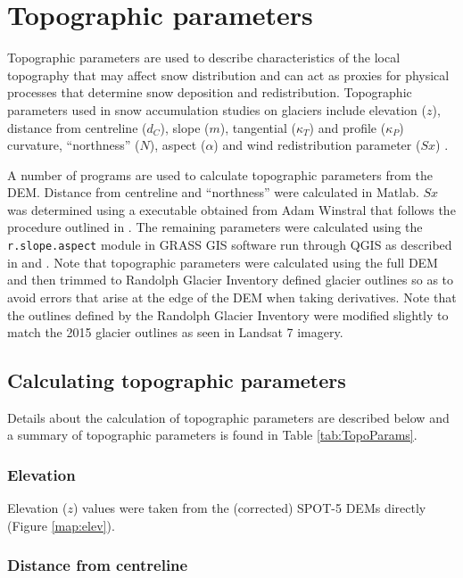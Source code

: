 \documentclass{sfuthesis}
\begin{document}
\section{Topographic parameters}
\label{sec:topoCalc}

Topographic parameters are used to describe characteristics of the local topography that may affect snow distribution and can act as proxies for physical processes that determine snow deposition and redistribution. Topographic parameters used in snow accumulation studies on glaciers include elevation ($z$), distance from centreline ($d_C$), slope ($m$), tangential ($\kappa_T$) and profile ($\kappa_P$) curvature, ``northness'' ($N$), aspect ($\alpha$) and wind redistribution parameter ($Sx$) \citep{Basist1994, Revuelto2014, McGrath2015}.	
 
A number of programs are used to calculate topographic parameters from the DEM. Distance from centreline and ``northness'' were calculated in Matlab. $Sx$ was determined using a executable obtained from Adam Winstral that follows the procedure outlined in \cite{Winstral2002}. The remaining parameters were calculated using the \texttt{r.slope.aspect} module in GRASS GIS software run through QGIS as described in \cite{Mitavsova1993} and \cite{Hofierka2009}. Note that topographic parameters were calculated using the full DEM and then trimmed to Randolph Glacier Inventory defined glacier outlines so as to avoid errors that arise at the edge of the DEM when taking derivatives. Note that the outlines defined by the Randolph Glacier Inventory were modified slightly to match the 2015 glacier outlines as seen in Landsat 7 imagery.

\subsection{Calculating topographic parameters}

Details about the calculation of topographic parameters are described below and a summary of topographic parameters is found in Table \ref{tab:TopoParams}.
\subsubsection*{Elevation}

Elevation ($z$) values were taken from the (corrected) SPOT-5 DEMs directly (Figure \ref{map:elev}).

\subsubsection*{Distance from centreline}
\end{document}
